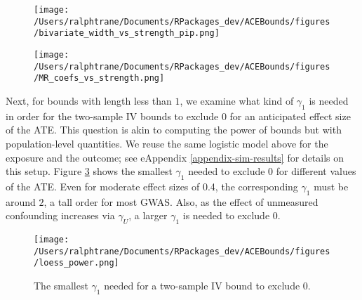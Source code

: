 \documentclass[
]{article}
\theoremstyle{plain}
\begin{document}
\begin{figure*}
  \centering
  \begin{subfigure}[t]{0.48\textwidth}
    \centering
    \caption{}
    \label{fig:biv_width_vs_strength}
    \texttt{[image: /Users/ralphtrane/Documents/RPackages\_dev/ACEBounds/figures/bivariate\_width\_vs\_strength\_pip.png]}
  \end{subfigure}%
  \hspace{0.15in}
  \begin{subfigure}[t]{0.48\textwidth}
    \centering
    \caption{}
    \label{fig:coef_vs_strength}
    \texttt{[image: /Users/ralphtrane/Documents/RPackages\_dev/ACEBounds/figures/MR\_coefs\_vs\_strength.png]}
  \end{subfigure}
  \caption{Illustration of the relationship between instrument strength, width of bounds obtained from two-sample design, and coefficients from logistic regression model. A: Relationship between instrument strength (ST) and width of the IV bounds. Black line is the upper bound on the two-sample IV bounds from Theorem 1. Black dots indicate one of the 10,000 IV bounds. Colored dots indicate bounds from real data; see Section \ref{data-analysis} for details. B: Coefficients from logistic regression model and instrument strength (ST).}
  \label{fig:biv_bounds_vs_strength}
\end{figure*}

Next, for bounds with length less than \(1\), we examine what kind of \(\gamma_1\) is needed in order for the two-sample IV bounds to exclude \(0\) for an anticipated effect size of the ATE. This question is akin to computing the power of bounds but with population-level quantities. We reuse the same logistic model above for the exposure and the outcome; see eAppendix \ref{appendix-sim-results} for details on this setup. Figure \ref{fig:power_curves} shows the smallest \(\gamma_1\) needed to exclude \(0\) for different values of the ATE. Even for moderate effect sizes of 0.4, the corresponding \(\gamma_1\) must be around \(2\), a tall order for most GWAS. Also, as the effect of unmeasured confounding increases via \(\gamma_U\), a larger \(\gamma_1\) is needed to exclude \(0\).

\begin{figure}[H]
  \centering
  \texttt{[image: /Users/ralphtrane/Documents/RPackages\_dev/ACEBounds/figures/loess\_power.png]}
  \caption{The smallest $\gamma_1$ needed for a two-sample IV bound to exclude $0$.}
  \label{fig:power_curves}
\end{figure}
\end{document}
